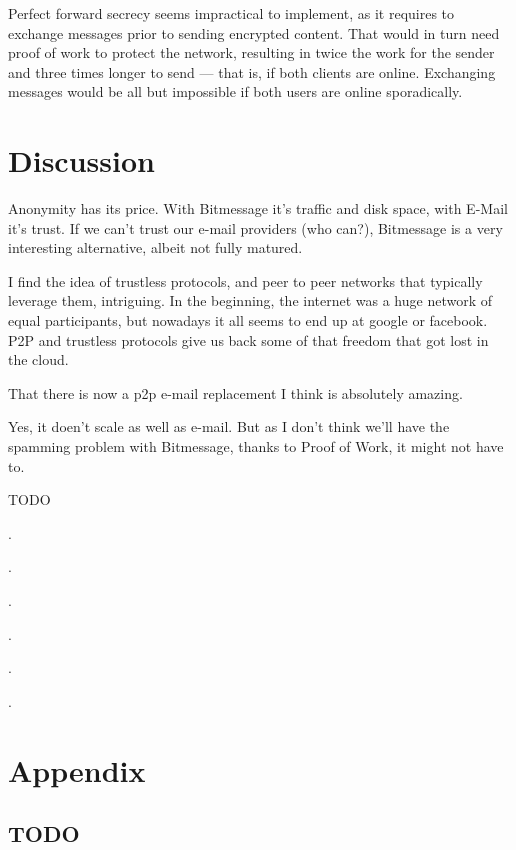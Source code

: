 \documentclass{bfh}
\begin{document}
  Perfect forward secrecy seems impractical to implement, as it requires to exchange messages prior to sending encrypted content. That would in turn need proof of work to protect the network, resulting in twice the work for the sender and three times longer to send --- that is, if both clients are online. Exchanging messages would be all but impossible if both users are online sporadically.

  \newpage
  \section{Discussion}

  Anonymity has its price. With Bitmessage it's traffic and disk space, with E-Mail it's trust. If we can't trust our e-mail providers (who can?), Bitmessage is a very interesting alternative, albeit not fully matured.

  I find the idea of trustless protocols, and peer to peer networks that typically leverage them, intriguing. In the beginning, the internet was a huge network of equal participants, but nowadays it all seems to end up at google or facebook. P2P and trustless protocols give us back some of that freedom that got lost in the cloud.

  That there is now a p2p e-mail replacement I think is absolutely amazing.

  Yes, it doen't scale as well as e-mail. But as I don't think we'll have the spamming problem with Bitmessage, thanks to Proof of Work, it might not have to.

  TODO

  .

  .

  .

  .

  .

  .


  
  

  \appendix
  \section*{Appendix}
  \renewcommand{\thesubsection}{\Alph{subsection}}

  \subsection{TODO}
\end{document}
